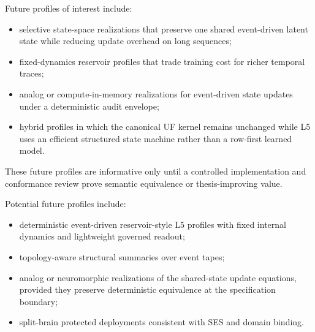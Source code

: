 Future profiles of interest include:
\begin{itemize}
    \item selective state-space realizations that preserve one shared event-driven latent state while reducing update overhead on long sequences;
    \item fixed-dynamics reservoir profiles that trade training cost for richer temporal traces;
    \item analog or compute-in-memory realizations for event-driven state updates under a deterministic audit envelope;
    \item hybrid profiles in which the canonical UF kernel remains unchanged while L5 uses an efficient structured state machine rather than a row-first learned model.
\end{itemize}
These future profiles are informative only until a controlled implementation and conformance review prove semantic equivalence or thesis-improving value.

Potential future profiles include:
\begin{itemize}
    \item deterministic event-driven reservoir-style L5 profiles with fixed internal dynamics and lightweight governed readout;
    \item topology-aware structural summaries over event tapes;
    \item analog or neuromorphic realizations of the shared-state update equations, provided they preserve deterministic equivalence at the specification boundary;
    \item split-brain protected deployments consistent with SES and domain binding.
\end{itemize}

